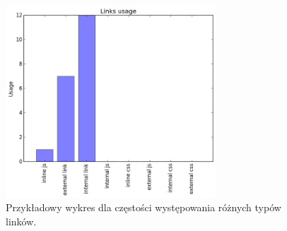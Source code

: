 \documentclass[12pt]{article}
\begin{document}
\begin{figure}[h]
\centering
\caption{Przykładowy wykres dla częstości występowania różnych typów linków.}
\label{img:wykresLinków}
\includegraphics[width=0.7\textwidth]{WykresLinki.png}
\end{figure}
\end{document}
